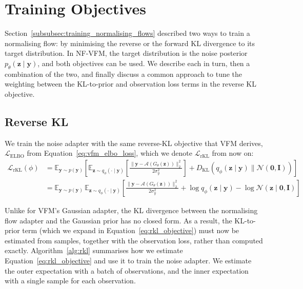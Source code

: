 \documentclass[12pt,a4paper]{report}
\begin{document}
\section{Training Objectives}
\label{sec:training_objectives}
Section~\ref{subsubsec:training_normalising_flows} described two ways to train a normalising flow: by minimising the reverse or the forward KL divergence to its target distribution. In NF-VFM, the target distribution is the noise posterior $p_{\theta}(\mathbf{z}\mid\mathbf{y})$, and both objectives can be used. 
We describe each in turn, then a combination of the two, and finally discuss a common approach to tune the weighting between the KL-to-prior and observation loss terms in the reverse KL objective. 

\subsection{Reverse KL}
\label{subsec:reverse_kl_objective}
We train the noise adapter with the same reverse-KL objective that VFM derives, $\mathcal{L}_{\mathrm{ELBO}}$ from Equation~\ref{eq:vfm_elbo_loss}, which we denote $\mathcal{L}_{\mathrm{rKL}}$ from now on:
\begin{align}
\mathcal{L}_{\mathrm{rKL}}(\phi)
&=
\mathbb{E}_{\mathbf{y}\sim p(\mathbf{y})}
\left[
\mathbb{E}_{\mathbf{z}\sim q_{\phi}(\cdot\mid\mathbf{y})}
\left[
\frac{\lVert\mathbf{y}-\mathcal{A}(G_{\theta}(\mathbf{z}))\rVert_2^2}{2\sigma_y^2}
\right]
+
D_{\mathrm{KL}}\left(q_{\phi}(\mathbf{z}\mid\mathbf{y})\parallel\mathcal{N}(\mathbf{0},\mathbf{I})\right)
\right]
\nonumber
\\
&=
\mathbb{E}_{\mathbf{y}\sim p(\mathbf{y})}\,
\mathbb{E}_{\mathbf{z}\sim q_{\phi}(\cdot\mid\mathbf{y})}
\left[
\frac{\lVert\mathbf{y}-\mathcal{A}(G_{\theta}(\mathbf{z}))\rVert_2^2}{2\sigma_y^2}
+\log q_{\phi}(\mathbf{z}\mid\mathbf{y})
-\log\mathcal{N}(\mathbf{z}\mid\mathbf{0},\mathbf{I})
\right]
\label{eq:rkl_objective}
\end{align}

Unlike for VFM's Gaussian adapter, the KL divergence between the normalising flow adapter and the Gaussian prior has no closed form. As a result, the KL-to-prior term (which we expand in Equation~\ref{eq:rkl_objective}) must now be estimated from samples, together with the observation loss, rather than computed exactly. Algorithm~\ref{alg:rkl} summarises how we estimate Equation~\ref{eq:rkl_objective} and use it to train the noise adapter. We estimate the outer expectation with a batch of observations, and the inner expectation with a single sample for each observation.
\end{document}

